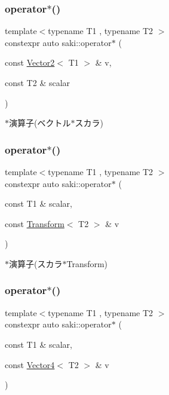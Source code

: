 \subsubsection{\texorpdfstring{operator$\ast$()}{operator*()}\hspace{0.1cm}{\footnotesize\ttfamily [4/14]}}
{\footnotesize\ttfamily template$<$typename T1 , typename T2 $>$ \\
constexpr auto saki\+::operator$\ast$ (\begin{DoxyParamCaption}\item[{const \mbox{\hyperlink{classsaki_1_1_vector2}{Vector2}}$<$ T1 $>$ \&}]{v,  }\item[{const T2 \&}]{scalar }\end{DoxyParamCaption})}



$\ast$演算子(ベクトル$\ast$スカラ) 

\mbox{\label{namespacesaki_a3d3864d0a671bd119a1d8202906d09d7}} 
\subsubsection{\texorpdfstring{operator$\ast$()}{operator*()}\hspace{0.1cm}{\footnotesize\ttfamily [5/14]}}
{\footnotesize\ttfamily template$<$typename T1 , typename T2 $>$ \\
constexpr auto saki\+::operator$\ast$ (\begin{DoxyParamCaption}\item[{const T1 \&}]{scalar,  }\item[{const \mbox{\hyperlink{classsaki_1_1_transform}{Transform}}$<$ T2 $>$ \&}]{v }\end{DoxyParamCaption})}



$\ast$演算子(スカラ$\ast$\+Transform) 

\mbox{\label{namespacesaki_adb31a759973c1c3d861bcaa5375f58bd}} 
\subsubsection{\texorpdfstring{operator$\ast$()}{operator*()}\hspace{0.1cm}{\footnotesize\ttfamily [6/14]}}
{\footnotesize\ttfamily template$<$typename T1 , typename T2 $>$ \\
constexpr auto saki\+::operator$\ast$ (\begin{DoxyParamCaption}\item[{const T1 \&}]{scalar,  }\item[{const \mbox{\hyperlink{classsaki_1_1_vector4}{Vector4}}$<$ T2 $>$ \&}]{v }\end{DoxyParamCaption})}



